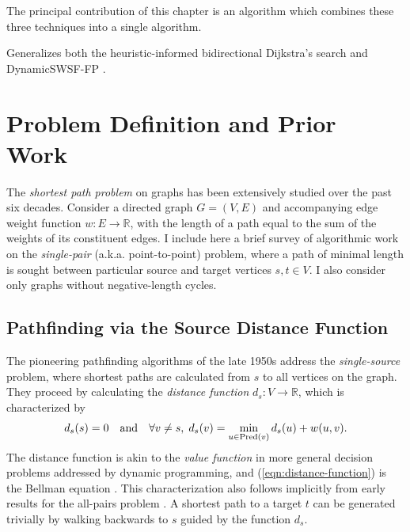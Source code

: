 The principal contribution of this chapter
is an algorithm which combines these three techniques into a single
algorithm.

Generalizes both the heuristic-informed
bidirectional Dijkstra's search \citep{goldberg2005spexternalmemory}
and DynamicSWSF-FP \citep{ramalingam1996}.



\section{Problem Definition and Prior Work}


The \emph{shortest path problem} on graphs has been extensively
studied over the past six decades.
Consider a directed graph $G = (V,E)$ and accompanying edge weight
function $w : E \rightarrow \mathbb{R}$,
with the length of a path equal to the sum of the weights of its
constituent edges.
I include here a brief survey of algorithmic work on the
\emph{single-pair} (a.k.a. point-to-point) problem,
where a path of minimal length is sought
between particular source and target vertices
$s,t \in V$.
I also consider only graphs without negative-length cycles.

\subsection{Pathfinding via the Source Distance Function}

The pioneering pathfinding algorithms of the late 1950s address
the \emph{single-source} problem,
where shortest paths are calculated from $s$ to all vertices on
the graph.
They proceed by calculating the \emph{distance function}
$d_s : V \rightarrow \mathbb{R}$,
which is characterized by
\begin{equation}
   d_s(s) = 0
   \quad\mbox{and}\quad
   \forall v \neq s,\;
   d_s(v) = \min_{u \in \mbox{\scriptsize Pred}(v)} d_s(u) + w(u,v).
   \label{eqn:distance-function}
\end{equation}
The distance function is akin to the \emph{value function}
in more general decision problems addressed by dynamic programming,
and (\ref{eqn:distance-function}) is the Bellman equation
\citep{bellman1958routing}.
This characterization also follows implicitly from early results for
the all-pairs problem
\citep{shimbel1955communicationnets, beckmann1955transportation}.
A shortest path to a target $t$ can be generated trivially
by walking backwards to $s$ guided by the function $d_s$.

